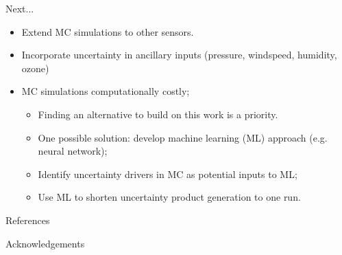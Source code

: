 \documentclass[final]{beamer}
\newlength{\onecolwid}
\begin{document}
\begin{frame}[t]
\begin{columns}[t]
\begin{column}{\onecolwid}
\begin{block}{Next...}
\begin{itemize}
\item Extend MC simulations to other sensors.
\item Incorporate uncertainty in ancillary inputs (pressure, windspeed, humidity, ozone)
\item MC simulations computationally costly;
	\begin{itemize}
	\item Finding an alternative to build on this work is a priority.
	\item One possible solution: develop machine learning (ML) approach (e.g. neural network);
	\item Identify uncertainty drivers in MC as potential inputs to ML;
 	\item Use ML to shorten uncertainty product generation to one run. 
	\end{itemize}
\end{itemize}

\end{block}



\begin{block}{References}
\nocite{} %
\small{
\vspace{0.75in}}

\end{block}



\begin{block}{Acknowledgements}

\small{} \\


\end{block}
\end{column}
\end{columns}
\end{frame}
\end{document}
